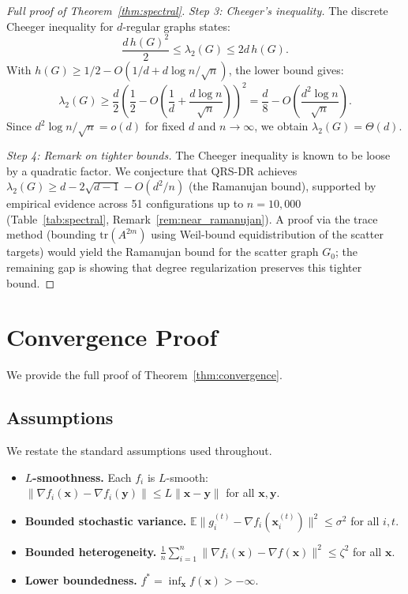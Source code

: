 \documentclass{article}
\newcommand{\E}{\mathbb{E}}
\newcommand{\bx}{\mathbf{x}}
\newcommand{\lam}{\lambda_2}
\begin{document}
\begin{proof}[Full proof of Theorem~\ref{thm:spectral}]
\emph{Step 3: Cheeger's inequality.}
The discrete Cheeger inequality for $d$-regular graphs
\cite{alon1986} states:
\[
\frac{d\,h(G)^2}{2} \le \lam(G) \le 2d\,h(G).
\]
With $h(G) \ge 1/2 - O(1/d + d\log n/\sqrt{n})$, the lower bound
gives:
\[
\lam(G) \ge \frac{d}{2}\left(\frac{1}{2} - O\!\left(\frac{1}{d}
+ \frac{d\log n}{\sqrt{n}}\right)\right)^2
= \frac{d}{8} - O\!\left(\frac{d^2\log n}{\sqrt{n}}\right).
\]
Since $d^2\log n/\sqrt{n} = o(d)$ for fixed $d$ and
$n \to \infty$, we obtain $\lam(G) = \Theta(d)$.

\emph{Step 4: Remark on tighter bounds.}
The Cheeger inequality is known to be loose by a quadratic factor.
We conjecture that QRS-DR achieves
$\lam(G) \ge d - 2\sqrt{d-1} - O(d^2/n)$ (the Ramanujan bound),
supported by empirical evidence across 51 configurations up to
$n = 10{,}000$ (Table~\ref{tab:spectral},
Remark~\ref{rem:near_ramanujan}).  A proof via the trace method
(bounding $\mathrm{tr}(A^{2m})$ using Weil-bound equidistribution
of the scatter targets) would yield the Ramanujan bound for the
scatter graph $G_0$; the remaining gap is showing that degree
regularization preserves this tighter bound.
\end{proof}

\section{Convergence Proof}
\label{app:convergence_proof}

We provide the full proof of Theorem~\ref{thm:convergence}.

\subsection{Assumptions}

We restate the standard assumptions used throughout.

\begin{itemize}
\item[\textbf{(A1)}] \textbf{$L$-smoothness.}  Each $f_i$ is
    $L$-smooth: $\|\nabla f_i(\bx) - \nabla f_i(\mathbf{y})\|
    \le L\|\bx - \mathbf{y}\|$ for all $\bx, \mathbf{y}$.
\item[\textbf{(A2)}] \textbf{Bounded stochastic variance.}
    $\E\|g_i^{(t)} - \nabla f_i(\bx_i^{(t)})\|^2 \le \sigma^2$
    for all $i, t$.
\item[\textbf{(A3)}] \textbf{Bounded heterogeneity.}
    $\frac{1}{n}\sum_{i=1}^n \|\nabla f_i(\bx) - \nabla f(\bx)\|^2
    \le \zeta^2$ for all $\bx$.
\item[\textbf{(A4)}] \textbf{Lower boundedness.}
    $f^* = \inf_{\bx} f(\bx) > -\infty$.
\end{itemize}
\end{document}
